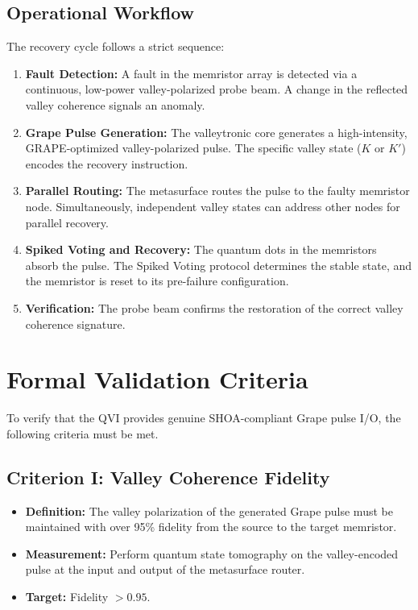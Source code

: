 \documentclass[12pt]{article}
\begin{document}
\subsection{Operational Workflow}
The recovery cycle follows a strict sequence:
\begin{enumerate}
    \item \textbf{Fault Detection:} A fault in the memristor array is detected via a continuous, low-power valley-polarized probe beam. A change in the reflected valley coherence signals an anomaly.
    \item \textbf{Grape Pulse Generation:} The valleytronic core generates a high-intensity, GRAPE-optimized valley-polarized pulse. The specific valley state ($K$ or $K'$) encodes the recovery instruction.
    \item \textbf{Parallel Routing:} The metasurface routes the pulse to the faulty memristor node. Simultaneously, independent valley states can address other nodes for parallel recovery.
    \item \textbf{Spiked Voting and Recovery:} The quantum dots in the memristors absorb the pulse. The Spiked Voting protocol determines the stable state, and the memristor is reset to its pre-failure configuration.
    \item \textbf{Verification:} The probe beam confirms the restoration of the correct valley coherence signature.
\end{enumerate}

\section{Formal Validation Criteria}
To verify that the QVI provides genuine SHOA-compliant Grape pulse I/O, the following criteria must be met.

\subsection{Criterion I: Valley Coherence Fidelity}
\begin{itemize}
    \item \textbf{Definition:} The valley polarization of the generated Grape pulse must be maintained with over 95\% fidelity from the source to the target memristor.
    \item \textbf{Measurement:} Perform quantum state tomography on the valley-encoded pulse at the input and output of the metasurface router.
    \item \textbf{Target:} Fidelity $> 0.95$.
\end{itemize}
\end{document}
